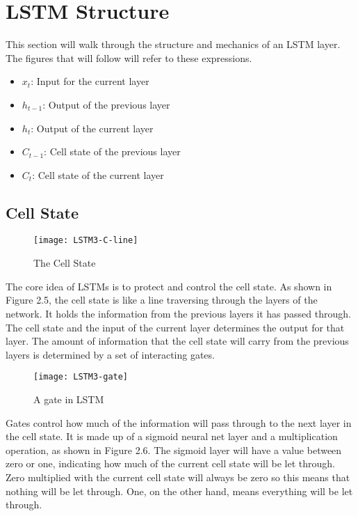 \section{LSTM Structure}
    This section will walk through the structure and mechanics of an LSTM layer. The figures that will follow will refer to these expressions.
        \begin{itemize}
        \item \( x_t \): Input for the current layer
        \item \( h_{t-1} \): Output of the previous layer
        \item \( h_t \): Output of the current layer
        \item \( C_{t-1} \): Cell state of the previous layer
        \item \( C_t \): Cell state of the current layer
        \end{itemize}

    \subsection{Cell State}
        \begin{figure}[H]
        \centering
        \texttt{[image: LSTM3-C-line]}
        \caption{The Cell State \citep{olah2015understanding}}
        \end{figure}
        The core idea of LSTMs is to protect and control the cell state. As shown in Figure 2.5, the cell state is like a line traversing through the layers of the network. It holds the information from the previous layers it has passed through. The cell state and the input of the current layer determines the output for that layer. The amount of information that the cell state will carry from the previous layers is determined by a set of interacting gates.

        \begin{figure}[H]
        \centering
        \texttt{[image: LSTM3-gate]}
        \caption{A gate in LSTM \citep{olah2015understanding}}
        \end{figure}
        Gates control how much of the information will pass through to the next layer in the cell state. It is made up of a sigmoid neural net layer and a multiplication operation, as shown in Figure 2.6. The sigmoid layer will have a value between zero or one, indicating how much of the current cell state will be let through. Zero multiplied with the current cell state will always be zero so this means that nothing will be let through. One, on the other hand, means everything will be let through.

